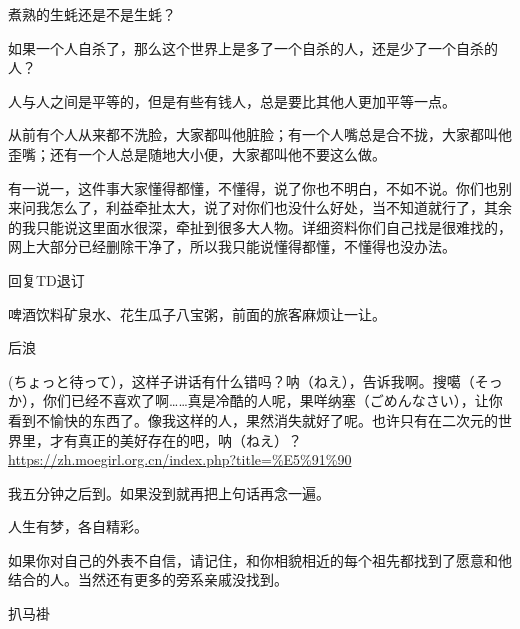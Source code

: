  煮熟的生蚝还是不是生蚝？
 
 如果一个人自杀了，那么这个世界上是多了一个自杀的人，还是少了一个自杀的人？
 
 人与人之间是平等的，但是有些有钱人，总是要比其他人更加平等一点。
 
 从前有个人从来都不洗脸，大家都叫他脏脸；有一个人嘴总是合不拢，大家都叫他歪嘴；还有一个人总是随地大小便，大家都叫他不要这么做。
 
 有一说一，这件事大家懂得都懂，不懂得，说了你也不明白，不如不说。你们也别来问我怎么了，利益牵扯太大，说了对你们也没什么好处，当不知道就行了，其余的我只能说这里面水很深，牵扯到很多大人物。详细资料你们自己找是很难找的，网上大部分已经删除干净了，所以我只能说懂得都懂，不懂得也没办法。
 
 回复TD退订
 
 啤酒饮料矿泉水、花生瓜子八宝粥，前面的旅客麻烦让一让。
 
 后浪
 
 (ちょっと待って），这样子讲话有什么错吗？呐（ねえ），告诉我啊。搜噶（そっか），你们已经不喜欢了啊……真是冷酷的人呢，果咩纳塞（ごめんなさい），让你看到不愉快的东西了。像我这样的人，果然消失就好了呢。也许只有在二次元的世界里，才有真正的美好存在的吧，呐（ねえ）？\url{https://zh.moegirl.org.cn/index.php?title=%E5%91%90}
 
 我五分钟之后到。如果没到就再把上句话再念一遍。
 
 人生有梦，各自精彩。
 
 如果你对自己的外表不自信，请记住，和你相貌相近的每个祖先都找到了愿意和他结合的人。当然还有更多的旁系亲戚没找到。
 
 扒马褂
 
 

